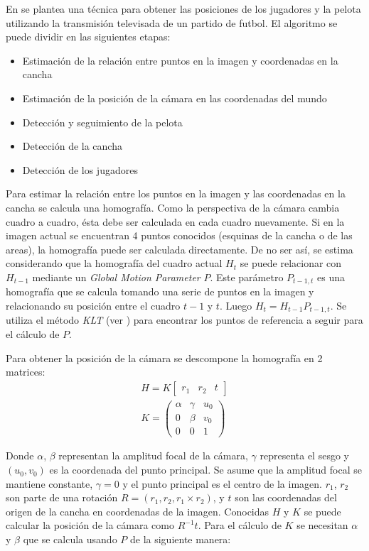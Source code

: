 En \cite{Liu20061146} se plantea una técnica para obtener las posiciones de los
jugadores y la pelota utilizando la transmisión televisada de un partido de
futbol. El algoritmo se puede dividir en las siguientes etapas:

\begin{itemize}
  \item Estimación de la relación entre puntos en la imagen y coordenadas en la cancha
  \item Estimación de la posición de la cámara en las coordenadas del mundo
  \item Detección y seguimiento de la pelota
  \item Detección de la cancha
  \item Detección de los jugadores
\end{itemize}

Para estimar la relación entre los puntos en la imagen y las coordenadas en la cancha se calcula una homografía.
Como la perspectiva de la cámara cambia cuadro a cuadro, ésta debe ser calculada en cada cuadro nuevamente.
Si en la imagen actual se encuentran 4 puntos conocidos (esquinas de la cancha o de las areas), la homografía puede ser calculada directamente.
De no ser así, se estima considerando que la homografía del cuadro actual $H_t$ se puede
relacionar con $H_{t-1}$ mediante un \textit{Global Motion Parameter} $P$.
Este parámetro $P_{t-1,t}$ es una homografía que se calcula tomando una serie de puntos en la imagen y relacionando su posición entre el cuadro $t-1$ y $t$.
Luego $ H_t = H_{t-1} P_{t-1,t}$. Se utiliza el método \textit{KLT} (ver \cite{KLT}) para encontrar los puntos de referencia a seguir para el cálculo de $P$.

Para obtener la posición de la cámara se descompone la homografía en 2 matrices:
\begin{eqnarray*}
H = K \begin{bmatrix} r_1 & r_2 & t \end{bmatrix} \\
K = \begin{pmatrix}
    \alpha & \gamma & u_0 \\
    0 & \beta & v_0 \\
    0 & 0 & 1
    \end{pmatrix}
\end{eqnarray*}

Donde $\alpha$, $\beta$ representan la amplitud focal de la cámara, $\gamma$ representa el sesgo y $(u_0, v_0)$ es la coordenada del punto principal.
Se asume que la amplitud focal se mantiene constante, $\gamma = 0$ y el punto principal es el centro de la imagen.
$r_1$, $r_2$ son parte de una rotación $R = (r_1, r_2, r_1 \times r_2)$, y $t$ son las coordenadas del origen de la cancha en coordenadas de la imagen.
Conocidas $H$ y $K$ se puede calcular la posición de la cámara como $R^{-1} t$.
Para el cálculo de $K$ se necesitan $\alpha$ y $\beta$ que se calcula usando $P$ de la siguiente manera:

